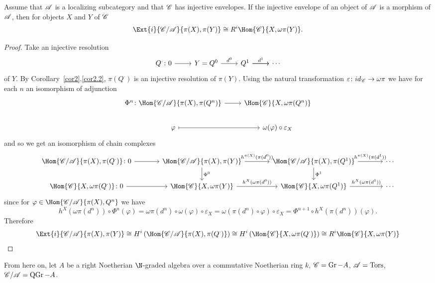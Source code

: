 \documentclass[10pt]{amsart}
\begin{document}
\begin{cor}\label{cor3}
  Assume that $\mathscr{A}$ is a localizing subcategory and that $\mathscr{C}$ has injective envelopes.
  If the injective envelope of an object of $\mathscr{A}$ is a morphism of $\mathscr{A}$, then for objects $X$ and $Y$ of $\mathscr{C}$
  $$\Ext{i}{\C/\A}{\pi(X), \pi(Y)} \cong R^i \Hom{\C}{X, \omega\pi(Y)}.$$
  
  \begin{proof}
    Take an injective resolution
    $$\begin{tikzcd}
      Q^\cdot \colon 0 \arrow{r} & Y = Q^0 \arrow{r}{d^0} & Q^1 \arrow{r}{d^1} \arrow{r} & \cdots 
    \end{tikzcd}$$
    of $Y$.
    By Corollary~\ref{cor2}.\ref{cor2.2}, $\pi(Q^\cdot)$ is an injective resolution of $\pi(Y)$.
    Using the natural transformation $\varepsilon \colon id_{\mathscr{C}} \rightarrow \omega\pi$ we have for each $n$ an isomorphism of adjunction
    $$\begin{tikzcd}
      \Phi^n \colon \Hom{\C/\A}{\pi(X), \pi(Q^n)} \arrow{r} & \Hom{\C}{X, \omega\pi(Q^n)}\\
      \varphi \arrow[mapsto]{r} & \omega(\varphi) \circ \varepsilon_X
    \end{tikzcd}$$
    and so we get an isomorphism of chain complexes
    $$\begin{tikzcd}[column sep=large]
      \Hom{\C/\A}{\pi(X), \pi(Q^\cdot)} \colon 0 \arrow{r} & \Hom{\C/\A}{\pi(X),\pi(Y)} \arrow{d}{\Phi^0}\arrow{r}{h^{\pi(X)}(\pi(d^0))} & \Hom{\C/\A}{\pi(X), \pi(Q^1)}\arrow{d}{\Phi^1} \arrow{r}{h^{\pi(X)}(\pi(d^1))} & \cdots\\
      \Hom{\C}{X, \omega\pi(Q^\cdot)} \colon 0 \arrow{r} & \Hom{\C}{X,\omega\pi(Y)} \arrow{r}{h^X(\omega\pi(d^0))} & \Hom{\C}{X, \omega\pi(Q^1)} \arrow{r}{h^X(\omega\pi(d^1))} & \cdots
    \end{tikzcd}$$
    since for $\varphi \in \Hom{\C/\A}{\pi(X), Q^n}$ we have
    $$h^X(\omega\pi(d^n)) \circ \Phi^n(\varphi) = \omega\pi(d^n) \circ \omega(\varphi) \circ \varepsilon_X = \omega(\pi(d^n) \circ \varphi) \circ \varepsilon_X = \Phi^{n+1} \circ h^X(\pi(d^n))(\varphi).$$
    Therefore 
    $$\Ext{i}{\C/\A}{\pi(X), \pi(Y)} \cong H^i\left(\Hom{\C/\A}{\pi(X), \pi(Q^\cdot)}\right) \cong H^i\left(\Hom{\C}{X, \omega\pi(Q^\cdot)}\right) \cong R^i \Hom{\C}{X, \omega\pi(Y)}$$
  \end{proof}
\end{cor}

From here on, let $A$ be a right Noetherian $\N$-graded algebra over a commutative Noetherian ring $k$, $\mathscr{C} = \operatorname{Gr}-A$, $\mathscr{A} = \operatorname{Tors}$, $\mathscr{C}/\mathscr{A} = \operatorname{QGr}-A$.
\end{document}
